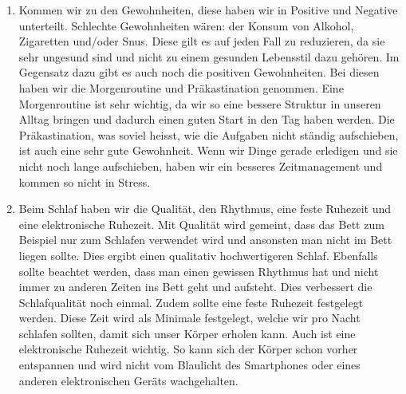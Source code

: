 \begin{enumerate}
  \item Kommen wir zu den Gewohnheiten, diese haben wir in Positive und Negative unterteilt. Schlechte Gewohnheiten wären: der Konsum von Alkohol, Zigaretten und/oder Snus. Diese gilt es auf jeden Fall zu reduzieren, da sie sehr ungesund sind und nicht zu einem gesunden Lebensstil dazu gehören. Im Gegensatz dazu gibt es auch noch die positiven Gewohnheiten. Bei diesen haben wir die Morgenroutine und Präkastination genommen. Eine Morgenroutine ist sehr wichtig, da wir so eine bessere Struktur in unseren Alltag bringen und dadurch einen guten Start in den Tag haben werden. Die Präkastination, was soviel heisst, wie die Aufgaben nicht ständig aufschieben, ist auch eine sehr gute Gewohnheit. Wenn wir Dinge gerade erledigen und sie nicht noch lange aufschieben, haben wir ein besseres Zeitmanagement und kommen so nicht in Stress.
  \item Beim Schlaf haben wir die Qualität, den Rhythmus, eine feste Ruhezeit und eine elektronische Ruhezeit. Mit Qualität wird gemeint, dass das Bett zum Beispiel nur zum Schlafen verwendet wird und ansonsten man nicht im Bett liegen sollte. Dies ergibt einen qualitativ hochwertigeren Schlaf. Ebenfalls sollte beachtet werden, dass man einen gewissen Rhythmus hat und nicht immer zu anderen Zeiten ins Bett geht und aufsteht. Dies verbessert die Schlafqualität noch einmal. Zudem sollte eine feste Ruhezeit festgelegt werden. Diese Zeit wird als Minimale festgelegt, welche wir pro Nacht schlafen sollten, damit sich unser Körper erholen kann. Auch ist eine elektronische Ruhezeit wichtig. So kann sich der Körper schon vorher entspannen und wird nicht vom Blaulicht des Smartphones oder eines anderen elektronischen Geräts wachgehalten.
\end{enumerate}